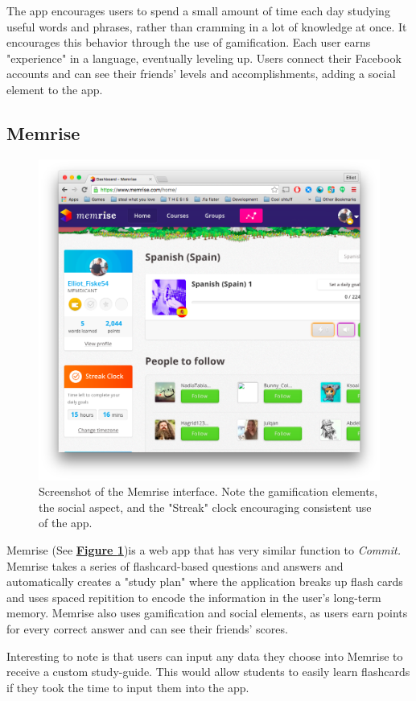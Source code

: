 \par The app encourages users to spend a small amount of time each day studying useful words and phrases, rather than cramming in a lot of knowledge at once. It encourages this behavior through the use of gamification. Each user earns "experience" in a language, eventually leveling up. Users connect their Facebook accounts and can see their friends' levels and accomplishments, adding a social element to the app.

\subsection{Memrise}

\begin{figure}
	\centering
	\includegraphics[width=0.7\linewidth]{memrise}
	\caption[Memrise]{Screenshot of the Memrise interface. Note the gamification elements, the social aspect, and the "Streak" clock encouraging consistent use of the app.}
	\label{fig:memrise}
\end{figure}

\par Memrise (See \textbf{\hyperref[fig:memrise]{Figure \ref*{fig:memrise}}})is a web app that has very similar function to \textit{Commit.} Memrise takes a series of flashcard-based questions and answers and automatically creates a "study plan" where the application breaks up flash cards and uses spaced repitition to encode the information in the user's long-term memory. Memrise also uses gamification and social elements, as users earn points for every correct answer and can see their friends' scores.

\par Interesting to note is that users can input any data they choose into Memrise to receive a custom study-guide. This would allow students to easily learn flashcards if they took the time to input them into the app.

